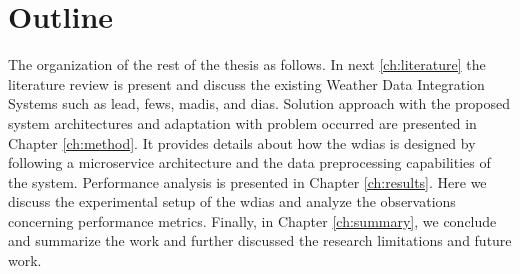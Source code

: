 \section{Outline}
The organization of the rest of the thesis as follows. In next \cref{ch:literature} the literature review is present and discuss the existing Weather Data Integration Systems such as \acrshort{lead}, \acrshort{fews}, \acrshort{madis}, and \acrshort{dias}. Solution approach with the proposed system architectures and adaptation with problem occurred are presented in Chapter \ref{ch:method}. It provides details about how the \acrshort{wdias} is designed by following a microservice architecture and the data preprocessing capabilities of the system. Performance analysis is presented in Chapter \ref{ch:results}. Here we discuss the experimental setup of the \acrshort{wdias} and analyze the observations concerning performance metrics. Finally, in Chapter \ref{ch:summary}, we conclude and summarize the work and further discussed the research limitations and future work.
